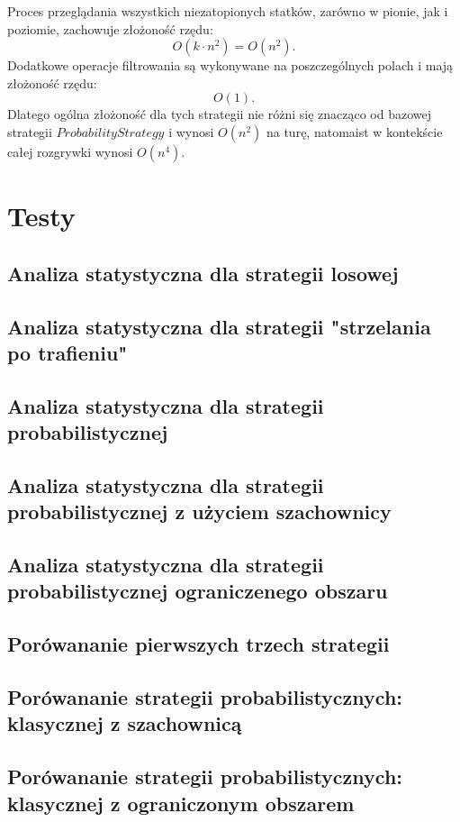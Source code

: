 \documentclass[magisterska]{pracadypl}
\begin{document}
{Proces przeglądania wszystkich niezatopionych statków, zarówno w pionie, jak i poziomie, zachowuje złożoność rzędu:
$$
O(k \cdot n^2) = O(n^2).
$$
Dodatkowe operacje filtrowania są wykonywane na poszczególnych polach i mają złożoność rzędu:
$$
O(1).
$$
Dlatego ogólna złożoność dla tych strategii nie różni się znacząco od bazowej strategii \newline $ProbabilityStrategy$ i wynosi $O(n^2)$ na turę, natomaist w kontekście całej rozgrywki wynosi $O(n^4)$.
\chapter{Testy}

\section{Analiza statystyczna dla strategii losowej}
\section{Analiza statystyczna dla strategii "strzelania po trafieniu"}
\section{Analiza statystyczna dla strategii probabilistycznej}
\section{Analiza statystyczna dla strategii probabilistycznej z użyciem szachownicy}
\section{Analiza statystyczna dla strategii probabilistycznej ograniczenego obszaru}
\section{Porówananie pierwszych trzech strategii}
\section{Porówananie strategii probabilistycznych: klasycznej z szachownicą}
\section{Porówananie strategii probabilistycznych: klasycznej z ograniczonym obszarem}
}
\end{document}
